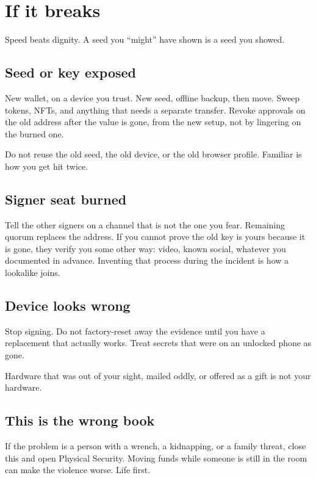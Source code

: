 \chapter{If it breaks}

Speed beats dignity. A seed you ``might'' have shown is
a seed you showed.

\section{Seed or key exposed}

New wallet, on a device you trust. New seed, offline
backup, then move. Sweep tokens, NFTs, and anything that
needs a separate transfer. Revoke approvals on the old
address after the value is gone, from the new setup,
not by lingering on the burned one.

Do not reuse the old seed, the old device, or the old
browser profile. Familiar is how you get hit twice.

\section{Signer seat burned}

Tell the other signers on a channel that is not the one
you fear. Remaining quorum replaces the address. If you
cannot prove the old key is yours because it is gone,
they verify you some other way: video, known social,
whatever you documented in advance. Inventing that
process during the incident is how a lookalike joins.

\section{Device looks wrong}

Stop signing. Do not factory-reset away the evidence
until you have a replacement that actually works. Treat
secrets that were on an unlocked phone as gone.

Hardware that was out of your sight, mailed oddly, or
offered as a gift is not your hardware.

\section{This is the wrong book}

If the problem is a person with a wrench, a kidnapping,
or a family threat, close this and open Physical
Security. Moving funds while someone is still in the
room can make the violence worse. Life first.

